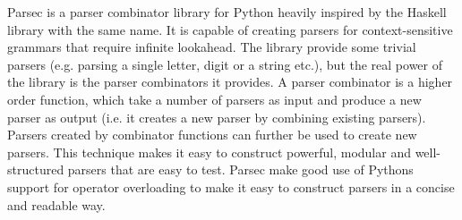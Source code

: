 Parsec\cite{parsec} is a parser combinator library for Python heavily inspired by the Haskell library with the same name. It is capable of creating parsers for context-sensitive grammars that require infinite lookahead. The library provide some trivial parsers (e.g. parsing a single letter, digit or a string etc.), but the real power of the library is the parser combinators it provides. A parser combinator is a higher order function, which take a number of parsers as input and produce a new parser as output (i.e. it creates a new parser by combining existing parsers). Parsers created by combinator functions can further be used to create new parsers. This technique makes it easy to construct powerful, modular and well-structured parsers that are easy to test. Parsec make good use of Pythons support for operator overloading to make it easy to construct parsers in a concise and readable way.


